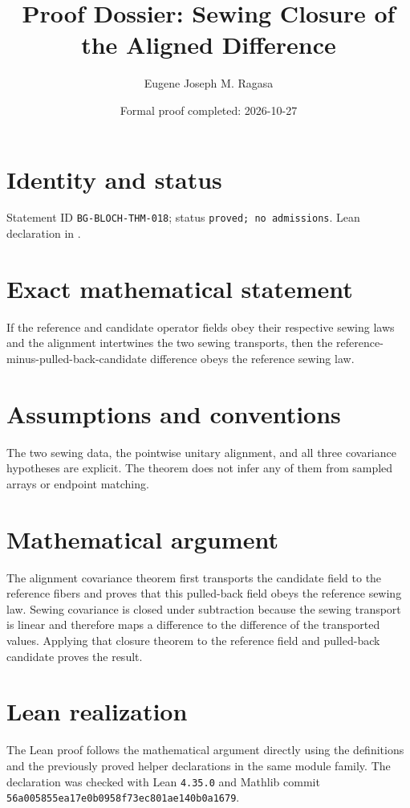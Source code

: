 \documentclass[11pt]{article}
\title{Proof Dossier: Sewing Closure of the Aligned Difference}
\author{Eugene Joseph M. Ragasa}
\date{Formal proof completed: 2026-10-27}
\begin{document}
\raggedright
\maketitle

\section{Identity and status}
Statement ID \texttt{BG-BLOCH-THM-018}; status \texttt{proved; no admissions}.  Lean declaration
 in
.

\section{Exact mathematical statement}
If the reference and candidate operator fields obey their respective sewing laws and the alignment intertwines the two sewing transports, then the reference-minus-pulled-back-candidate difference obeys the reference sewing law.

\section{Assumptions and conventions}
The two sewing data, the pointwise unitary alignment, and all three covariance hypotheses are explicit.  The theorem does not infer any of them from sampled arrays or endpoint matching.

\section{Mathematical argument}
The alignment covariance theorem first transports the candidate field to the reference fibers and proves that this pulled-back field obeys the reference sewing law.  Sewing covariance is closed under subtraction because the sewing transport is linear and therefore maps a difference to the difference of the transported values.  Applying that closure theorem to the reference field and pulled-back candidate proves the result.

\section{Lean realization}
The Lean proof follows the mathematical argument directly using the definitions and the
previously proved helper declarations in the same module family.  The declaration was checked
with Lean \texttt{4.35.0} and Mathlib commit \texttt{56a005855ea17e0b0958f73ec801ae140b0a1679}.
\end{document}

